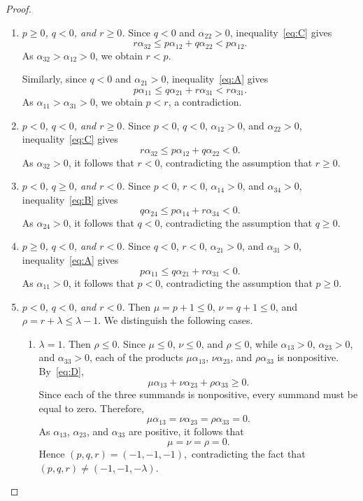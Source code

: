 \documentclass[12pt,a4paper]{amsart}
\theoremstyle{definition}
\begin{document}
\begin{proof}
\begin{enumerate}
\item[\textbf{Case 4.}] \textit{$p\geq0$, $q<0$, and $r\geq0$.} Since $q<0$ and $\alpha_{22}>0$, inequality~\eqref{eq:C} gives
\[
r\alpha_{32}
\le
p\alpha_{12}+q\alpha_{22}
<
p\alpha_{12}.
\]
As $\alpha_{32}>\alpha_{12}>0$, we obtain $r<p$.

Similarly, since $q<0$ and $\alpha_{21}>0$, inequality~\eqref{eq:A}
gives
\[
p\alpha_{11}
\le
q\alpha_{21}+r\alpha_{31}
<
r\alpha_{31}.
\]
As $\alpha_{11}>\alpha_{31}>0$, we obtain $p<r$, a contradiction.

\item[\textbf{Case 5.}] \textit{$p<0$, $q<0$, and $r\geq0$.} Since $p<0$, $q<0$, $\alpha_{12}>0$, and $\alpha_{22}>0$, inequality~\eqref{eq:C} gives
\[
r\alpha_{32}
\le
p\alpha_{12}+q\alpha_{22}
<
0.
\]
As $\alpha_{32}>0$, it follows that $r<0$, contradicting the
assumption that $r\ge0$.

\item[\textbf{Case 6.}] \textit{$p<0$, $q\ge0$, and $r<0$.} Since $p<0$, $r<0$, $\alpha_{14}>0$, and $\alpha_{34}>0$, inequality~\eqref{eq:B} gives
\[
q\alpha_{24}
\le
p\alpha_{14}+r\alpha_{34}
<
0.
\]
As $\alpha_{24}>0$, it follows that $q<0$, contradicting the
assumption that $q\ge0$.

\item[\textbf{Case 7.}] \textit{$p\ge0$, $q<0$, and $r<0$.} Since $q<0$, $r<0$, $\alpha_{21}>0$, and $\alpha_{31}>0$, inequality~\eqref{eq:A} gives
\[
p\alpha_{11}
\le
q\alpha_{21}+r\alpha_{31}
<
0.
\]
As $\alpha_{11}>0$, it follows that $p<0$, contradicting the
assumption that $p\ge0$.

\item[\textbf{Case 8.}]  \textit{$p<0$, $q<0$, and $r<0$.} Then $\mu=p+1\leq0$, $\nu=q+1\leq0$, and $\rho=r+\lambda\leq\lambda-1$. We distinguish the following cases.
\begin{enumerate}
\item[(a)] $\lambda=1$. Then $\rho\le0$. Since $\mu\le0$, $\nu\le0$, and $\rho\le0$, while
$\alpha_{13}>0$, $\alpha_{23}>0$, and $\alpha_{33}>0$, each of the
products $\mu\alpha_{13}$, $\nu\alpha_{23}$, and
$\rho\alpha_{33}$ is nonpositive. By~\eqref{eq:D},
\[
\mu\alpha_{13}
+\nu\alpha_{23}
+\rho\alpha_{33}
\ge0.
\]
Since each of the three summands is nonpositive, every summand must
be equal to zero. Therefore,
\[
\mu\alpha_{13}
=
\nu\alpha_{23}
=
\rho\alpha_{33}
=
0.
\]
As $\alpha_{13}$, $\alpha_{23}$, and $\alpha_{33}$ are positive, it
follows that
\[
\mu=\nu=\rho=0.
\]
Hence
$
(p,q,r)=(-1,-1,-1),$
contradicting the fact that
$
(p,q,r)\neq(-1,-1,-\lambda).$


\end{enumerate}
\end{enumerate}
\end{proof}
\end{document}
